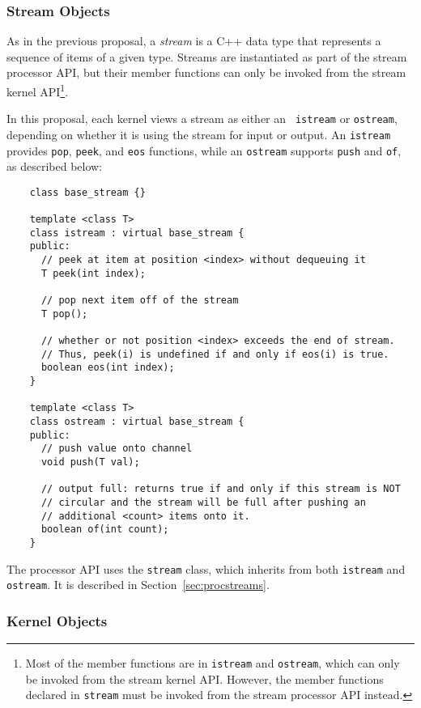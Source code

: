 \subsubsection{Stream Objects}
\label{sec:kerstreams}

As in the previous proposal, a {\it stream} is a C++ data type that
represents a sequence of items of a given type.  Streams are
instantiated as part of the stream processor API, but their member
functions can only be invoked from the stream kernel API\footnote{Most
of the member functions are in {\tt istream} and {\tt ostream}, which
can only be invoked from the stream kernel API.  However, the member
functions declared in {\tt stream} must be invoked from the stream
processor API instead.}.

In this proposal, each kernel views a stream as either an {\tt
istream} or {\tt ostream}, depending on whether it is using the stream
for input or output.  An {\tt istream} provides {\tt pop}, {\tt peek},
and {\tt eos} functions, while an {\tt ostream} supports {\tt push}
and {\tt of}, as described below: {\small
\begin{verbatim}
    class base_stream {}

    template <class T>
    class istream : virtual base_stream {
    public:
      // peek at item at position <index> without dequeuing it
      T peek(int index);

      // pop next item off of the stream
      T pop();

      // whether or not position <index> exceeds the end of stream.
      // Thus, peek(i) is undefined if and only if eos(i) is true.
      boolean eos(int index);
    }

    template <class T>
    class ostream : virtual base_stream {
    public:
      // push value onto channel
      void push(T val);

      // output full: returns true if and only if this stream is NOT 
      // circular and the stream will be full after pushing an
      // additional <count> items onto it.
      boolean of(int count);
    }  
\end{verbatim}}

The processor API uses the {\tt stream} class, which inherits from
both {\tt istream} and {\tt ostream}. It is described in
Section~\ref{sec:procstreams}.

\subsubsection{Kernel Objects}
\label{sec:kernels}

